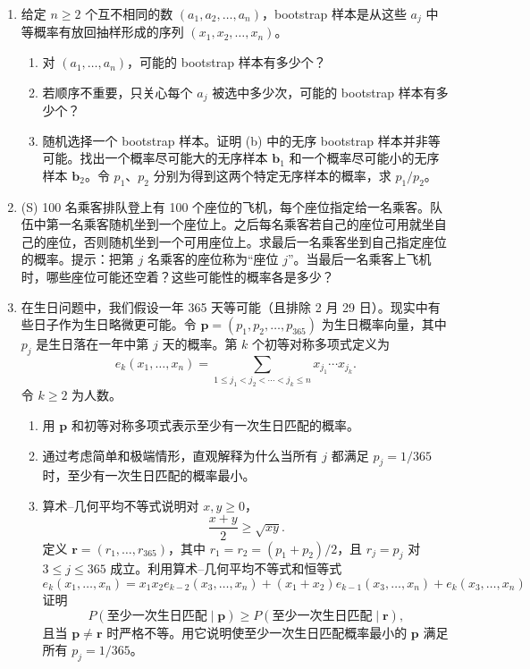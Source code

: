 \documentclass[UTF8,12pt,a4paper,fontset=fandol]{ctexart}
\begin{document}
\begin{enumerate}
  \item 给定 $n\ge2$ 个互不相同的数 $(a_1,a_2,\ldots,a_n)$，bootstrap 样本是从这些 $a_j$ 中等概率有放回抽样形成的序列 $(x_1,x_2,\ldots,x_n)$。
  \begin{enumerate}
    \item 对 $(a_1,\ldots,a_n)$，可能的 bootstrap 样本有多少个？
    \item 若顺序不重要，只关心每个 $a_j$ 被选中多少次，可能的 bootstrap 样本有多少个？
    \item 随机选择一个 bootstrap 样本。证明 (b) 中的无序 bootstrap 样本并非等可能。找出一个概率尽可能大的无序样本 $\mathbf b_1$ 和一个概率尽可能小的无序样本 $\mathbf b_2$。令 $p_1$、$p_2$ 分别为得到这两个特定无序样本的概率，求 $p_1/p_2$。
  \end{enumerate}

  \item (S) 100 名乘客排队登上有 100 个座位的飞机，每个座位指定给一名乘客。队伍中第一名乘客随机坐到一个座位上。之后每名乘客若自己的座位可用就坐自己的座位，否则随机坐到一个可用座位上。求最后一名乘客坐到自己指定座位的概率。提示：把第 $j$ 名乘客的座位称为“座位 $j$”。当最后一名乘客上飞机时，哪些座位可能还空着？这些可能性的概率各是多少？

  \item 在生日问题中，我们假设一年 365 天等可能（且排除 2 月 29 日）。现实中有些日子作为生日略微更可能。令 $\mathbf p=(p_1,p_2,\ldots,p_{365})$ 为生日概率向量，其中 $p_j$ 是生日落在一年中第 $j$ 天的概率。第 $k$ 个初等对称多项式定义为
  \[
    e_k(x_1,\ldots,x_n)
    =\sum_{1\le j_1<j_2<\cdots<j_k\le n}x_{j_1}\cdots x_{j_k}.
  \]
  令 $k\ge2$ 为人数。
  \begin{enumerate}
    \item 用 $\mathbf p$ 和初等对称多项式表示至少有一次生日匹配的概率。
    \item 通过考虑简单和极端情形，直观解释为什么当所有 $j$ 都满足 $p_j=1/365$ 时，至少有一次生日匹配的概率最小。
    \item 算术--几何平均不等式说明对 $x,y\ge0$，
    \[
      \frac{x+y}{2}\ge\sqrt{xy}.
    \]
    定义 $\mathbf r=(r_1,\ldots,r_{365})$，其中 $r_1=r_2=(p_1+p_2)/2$，且 $r_j=p_j$ 对 $3\le j\le365$ 成立。利用算术--几何平均不等式和恒等式
    \[
      e_k(x_1,\ldots,x_n)
      =x_1x_2e_{k-2}(x_3,\ldots,x_n)
      +(x_1+x_2)e_{k-1}(x_3,\ldots,x_n)
      +e_k(x_3,\ldots,x_n)
    \]
    证明
    \[
      P(\text{至少一次生日匹配}\mid\mathbf p)
      \ge
      P(\text{至少一次生日匹配}\mid\mathbf r),
    \]
    且当 $\mathbf p\ne\mathbf r$ 时严格不等。用它说明使至少一次生日匹配概率最小的 $\mathbf p$ 满足所有 $p_j=1/365$。
  \end{enumerate}
\end{enumerate}
\end{document}
